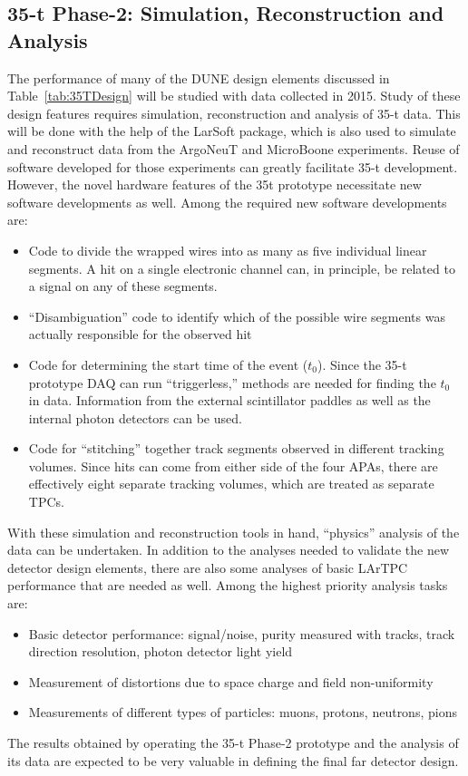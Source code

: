 \subsection{35-t Phase-2: Simulation, Reconstruction and Analysis}
The performance of many of the DUNE design elements discussed in
Table~\ref{tab:35TDesign} will be studied with data collected in 2015.
Study of these design features requires simulation, reconstruction and
analysis of 35-t data.  This will be done with the help of the
LarSoft package, which is also used to simulate and reconstruct data
from the ArgoNeuT and MicroBoone experiments.  Reuse of software
developed for those experiments can greatly facilitate 35-t
development.  However, the novel hardware features of the 35t
prototype necessitate new software developments as well.  Among the
required new software developments are:
\begin{itemize}
\item{Code to divide the wrapped wires into as many as five individual linear segments. 
A hit on a single electronic channel can, in principle, be related to a
signal on any of these segments.}
\item{``Disambiguation'' code to identify which of the possible wire segments was actually responsible
for the observed hit}
\item{Code for determining the start time of the event ($t_0$). Since the 35-t prototype DAQ can
run ``triggerless,'' methods are needed for finding the $t_0$ in data. Information from the external 
scintillator paddles as well as the internal photon detectors can be used.}
\item{Code for ``stitching'' together track segments observed in different tracking volumes. 
Since hits can come from either side of the four APAs, there are 
effectively eight separate tracking volumes, 
which are treated as separate TPCs.}
\end{itemize}

With these simulation and reconstruction tools in hand, ``physics''
analysis of the data can be undertaken.
In addition to the analyses needed to validate the new detector design elements, there are also
some analyses of basic LArTPC performance that are needed as well.
Among the highest priority analysis tasks are:

\begin{itemize}
\item{Basic detector performance: signal/noise, purity measured with tracks, track direction resolution, 
photon detector light yield}
\item{Measurement of distortions due to space charge and field non-uniformity}
\item{Measurements of different types of particles: muons, protons, neutrons, pions}
\end{itemize}

The results obtained by operating the 35-t Phase-2 prototype and the analysis of its data are expected
to be very valuable in defining the final far detector design. 
